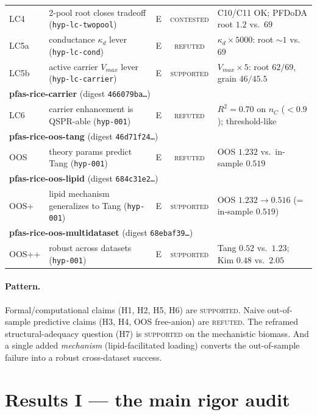 \documentclass[11pt]{article}
\begin{document}
\begin{longtable}{p{1.6cm} p{3.2cm} c c p{5.2cm}}
LC4 & 2-pool root closes tradeoff (\texttt{hyp-lc-twopool}) & E & \textsc{contested} & C10/C11 OK; PFDoDA root $1.2$ vs.\ $69$ \\
LC5a & conductance $\kappa_d$ lever (\texttt{hyp-lc-cond}) & E & \textsc{refuted} & $\kappa_d\times5000$: root $\sim1$ vs.\ $69$ \\
LC5b & active carrier $V_{max}$ lever (\texttt{hyp-lc-carrier}) & E & \textsc{supported} & $V_{max}\times5$: root $62/69$, grain $46/45.5$ \\
\midrule
\multicolumn{5}{l}{\textbf{pfas-rice-carrier} \quad (digest \texttt{466079ba\ldots})}\\
\midrule
LC6 & carrier enhancement is QSPR-able (\texttt{hyp-001}) & E & \textsc{refuted} & $R^2=0.70$ on $n_C$ ($<0.9$); threshold-like \\
\midrule
\multicolumn{5}{l}{\textbf{pfas-rice-oos-tang} \quad (digest \texttt{46d71f24\ldots})}\\
\midrule
OOS & theory params predict Tang (\texttt{hyp-001}) & E & \textsc{refuted} & OOS $1.232$ vs.\ in-sample $0.519$ \\
\midrule
\multicolumn{5}{l}{\textbf{pfas-rice-oos-lipid} \quad (digest \texttt{684c31e2\ldots})}\\
\midrule
OOS+ & lipid mechanism generalizes to Tang (\texttt{hyp-001}) & E & \textsc{supported} & OOS $1.232\!\to\!0.516$ (= in-sample $0.519$) \\
\midrule
\multicolumn{5}{l}{\textbf{pfas-rice-oos-multidataset} \quad (digest \texttt{68ebaf39\ldots})}\\
\midrule
OOS++ & robust across datasets (\texttt{hyp-001}) & E & \textsc{supported} & Tang $0.52$ vs.\ $1.23$; Kim $0.48$ vs.\ $2.05$ \\
\end{longtable}

\paragraph{Pattern.} Formal/computational claims (H1, H2, H5, H6) are
\textsc{supported}. Naive out-of-sample predictive claims (H3, H4, OOS
free-anion) are \textsc{refuted}. The reframed structural-adequacy
question (H7) is \textsc{supported} on the mechanistic biomass. And a
single added \emph{mechanism} (lipid-facilitated loading) converts the
out-of-sample failure into a robust cross-dataset success.

\section{Results I --- the main rigor audit}
\label{sec:main}
\end{document}
